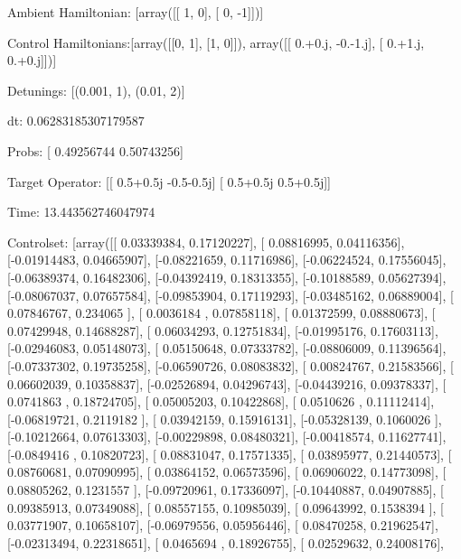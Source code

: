 \documentclass{article}
\begin{document}
    

\newpage

Ambient Hamiltonian: [array([[ 1,  0],
       [ 0, -1]])]

Control Hamiltonians:[array([[0, 1],
       [1, 0]]), array([[ 0.+0.j, -0.-1.j],
       [ 0.+1.j,  0.+0.j]])]

Detunings: [(0.001, 1), (0.01, 2)]

 dt: 0.06283185307179587

Probs: [ 0.49256744  0.50743256]

Target Operator: [[ 0.5+0.5j -0.5-0.5j]
 [ 0.5+0.5j  0.5+0.5j]]

Time: 13.443562746047974

Controlset: [array([[ 0.03339384,  0.17120227],
       [ 0.08816995,  0.04116356],
       [-0.01914483,  0.04665907],
       [-0.08221659,  0.11716986],
       [-0.06224524,  0.17556045],
       [-0.06389374,  0.16482306],
       [-0.04392419,  0.18313355],
       [-0.10188589,  0.05627394],
       [-0.08067037,  0.07657584],
       [-0.09853904,  0.17119293],
       [-0.03485162,  0.06889004],
       [ 0.07846767,  0.234065  ],
       [ 0.0036184 ,  0.07858118],
       [ 0.01372599,  0.08880673],
       [ 0.07429948,  0.14688287],
       [ 0.06034293,  0.12751834],
       [-0.01995176,  0.17603113],
       [-0.02946083,  0.05148073],
       [ 0.05150648,  0.07333782],
       [-0.08806009,  0.11396564],
       [-0.07337302,  0.19735258],
       [-0.06590726,  0.08083832],
       [ 0.00824767,  0.21583566],
       [ 0.06602039,  0.10358837],
       [-0.02526894,  0.04296743],
       [-0.04439216,  0.09378337],
       [ 0.0741863 ,  0.18724705],
       [ 0.05005203,  0.10422868],
       [ 0.0510626 ,  0.11112414],
       [-0.06819721,  0.2119182 ],
       [ 0.03942159,  0.15916131],
       [-0.05328139,  0.1060026 ],
       [-0.10212664,  0.07613303],
       [-0.00229898,  0.08480321],
       [-0.00418574,  0.11627741],
       [-0.0849416 ,  0.10820723],
       [ 0.08831047,  0.17571335],
       [ 0.03895977,  0.21440573],
       [ 0.08760681,  0.07090995],
       [ 0.03864152,  0.06573596],
       [ 0.06906022,  0.14773098],
       [ 0.08805262,  0.1231557 ],
       [-0.09720961,  0.17336097],
       [-0.10440887,  0.04907885],
       [ 0.09385913,  0.07349088],
       [ 0.08557155,  0.10985039],
       [ 0.09643992,  0.1538394 ],
       [ 0.03771907,  0.10658107],
       [-0.06979556,  0.05956446],
       [ 0.08470258,  0.21962547],
       [-0.02313494,  0.22318651],
       [ 0.0465694 ,  0.18926755],
       [ 0.02529632,  0.24008176],
\end{document}
